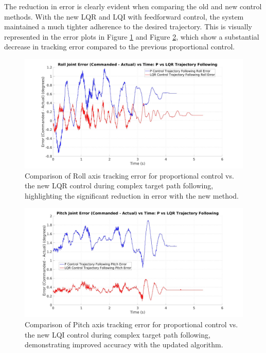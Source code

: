 The reduction in error is clearly evident when comparing the old and new control methods. With the new LQR and LQI with feedforward control, the system maintained a much tighter adherence to the desired trajectory. This is visually represented in the error plots in Figure \ref{fig:roll_traj_error} and Figure \ref{fig:pitch_traj_error}, which show a substantial decrease in tracking error compared to the previous proportional control.

\begin{figure}[h!]
    \centering
    \includegraphics[width=1.00\linewidth]{figures/roll_traj_error.jpg}
    \caption{Comparison of Roll axis tracking error for proportional control vs. the new LQR control during complex target path following, highlighting the significant reduction in error with the new method.}
    \label{fig:roll_traj_error}
\end{figure}

\begin{figure}[h!]
    \centering
    \includegraphics[width=1.0\linewidth]{figures/pitch_traj_error.jpg}
    \centering
    \caption{Comparison of Pitch axis tracking error for proportional control vs. the new LQI control during complex target path following, demonstrating improved accuracy with the updated algorithm.}
    \label{fig:pitch_traj_error}
\end{figure}
